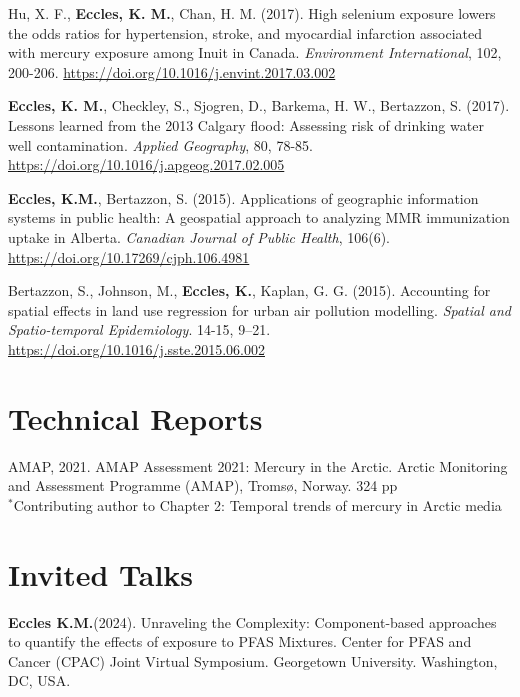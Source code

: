\documentclass[margin,line]{res}
\begin{document}
\begin{resume}
Hu, X. F., \textbf{Eccles, K. M.}, Chan, H. M. (2017). High selenium exposure lowers the odds ratios for hypertension, stroke, and myocardial infarction associated with mercury exposure among Inuit in Canada. \textit{Environment International}, 102, 200-206. \url{https://doi.org/10.1016/j.envint.2017.03.002}

\textbf{Eccles, K. M.}, Checkley, S., Sjogren, D., Barkema, H. W., Bertazzon, S. (2017). Lessons learned from the 2013 Calgary flood: Assessing risk of drinking water well contamination. \textit{Applied Geography}, 80, 78-85. \url{https://doi.org/10.1016/j.apgeog.2017.02.005}
\pagebreak

\textbf{Eccles, K.M.}, Bertazzon, S. (2015). Applications of geographic information systems in public health: A geospatial approach to analyzing MMR immunization uptake in Alberta. \textit{Canadian Journal of Public Health}, 106(6). \url{https://doi.org/10.17269/cjph.106.4981}

Bertazzon, S., Johnson, M., \textbf{Eccles, K.}, Kaplan, G. G. (2015). Accounting for spatial effects in land use regression for urban air pollution modelling. \textit{Spatial and Spatio-temporal Epidemiology}. 14-15, 9–21. \url{https://doi.org/10.1016/j.sste.2015.06.002}


\vspace*{.1in}
\section{\sc Technical Reports}
AMAP, 2021. AMAP Assessment 2021: Mercury in the Arctic. Arctic Monitoring and Assessment Programme (AMAP), Tromsø, Norway. 324 pp\\
$^{*}$Contributing author to Chapter 2: Temporal trends of mercury in Arctic media\\
\vspace*{.1in}
\section{\sc Invited Talks}


\textbf{Eccles K.M.}(2024). Unraveling the Complexity: Component-based approaches to quantify the effects of exposure to PFAS Mixtures. Center for PFAS and Cancer (CPAC) Joint Virtual Symposium. Georgetown University. Washington, DC, USA.


\end{resume}
\end{document}
